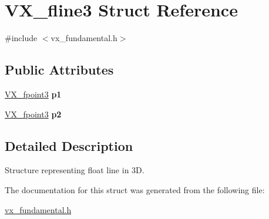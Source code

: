 \hypertarget{structVX__fline3}{\section{V\-X\-\_\-fline3 Struct Reference}
\label{structVX__fline3}
}


{\ttfamily \#include $<$vx\-\_\-fundamental.\-h$>$}

\subsection*{Public Attributes}
\begin{DoxyCompactItemize}
\item 
\hypertarget{structVX__fline3_a820ff552f14d95018ff1f7ac637f373b}{\hyperlink{structVX__fpoint3}{V\-X\-\_\-fpoint3} {\bfseries p1}}\label{structVX__fline3_a820ff552f14d95018ff1f7ac637f373b}

\item 
\hypertarget{structVX__fline3_a29bb5c876469b680c9e8174a31fd343a}{\hyperlink{structVX__fpoint3}{V\-X\-\_\-fpoint3} {\bfseries p2}}\label{structVX__fline3_a29bb5c876469b680c9e8174a31fd343a}

\end{DoxyCompactItemize}


\subsection{Detailed Description}
Structure representing float line in 3\-D. 

The documentation for this struct was generated from the following file\-:\begin{DoxyCompactItemize}
\item 
\hyperlink{vx__fundamental_8h}{vx\-\_\-fundamental.\-h}\end{DoxyCompactItemize}
